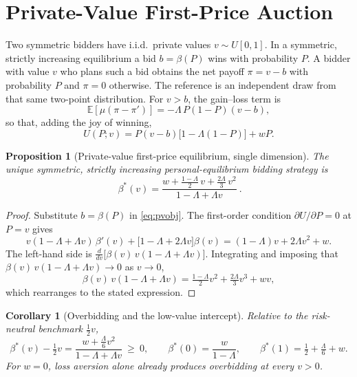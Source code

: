 \documentclass[11pt,a4paper]{article}
\newtheorem{proposition}{Proposition}
\newtheorem{corollary}{Corollary}
\theoremstyle{remark}
\begin{document}
\section{Private-Value First-Price Auction}
\label{sec:pv}
Two symmetric bidders have i.i.d.\ private values $v\sim U[0,1]$. In a symmetric,
strictly increasing equilibrium a bid $b=\beta(P)$ wins with probability $P$. A
bidder with value $v$ who plans such a bid obtains the net payoff $\pi=v-b$ with
probability $P$ and $\pi=0$ otherwise. The reference is an independent draw from
that same two-point distribution. For $v>b$, the gain--loss term is
\begin{equation}
\mathbb{E}[\mu(\pi-\pi')]=-\Lambda\,P(1-P)(v-b),
\end{equation}
so that, adding the joy of winning,
\begin{equation}
U(P;v)=P(v-b)\big[1-\Lambda(1-P)\big]+wP .
\label{eq:pvobj}
\end{equation}
\begin{proposition}[Private-value first-price equilibrium, single dimension]
\label{prop:pv}
The unique symmetric, strictly increasing personal-equilibrium bidding strategy is
\begin{equation}
\boxed{\ \beta^{*}(v)=\frac{w+\tfrac{1-\Lambda}{2}\,v+\tfrac{2\Lambda}{3}\,v^{2}}
{1-\Lambda+\Lambda v}\ }.
\end{equation}
\end{proposition}
\begin{proof}
Substitute $b=\beta(P)$ in \eqref{eq:pvobj}. The first-order condition
$\partial U/\partial P=0$ at $P=v$ gives
\begin{equation}
v(1-\Lambda+\Lambda v)\,\beta'(v)+\big[1-\Lambda+2\Lambda v\big]\beta(v)
=(1-\Lambda)v+2\Lambda v^{2}+w .
\end{equation}
The left-hand side is $\frac{d}{dv}\big[\beta(v)\,v(1-\Lambda+\Lambda v)\big]$.
Integrating and imposing that $\beta(v)\,v(1-\Lambda+\Lambda v)\to0$ as $v\to0$,
\begin{equation}
\beta(v)\,v(1-\Lambda+\Lambda v)=\tfrac{1-\Lambda}{2}v^{2}+\tfrac{2\Lambda}{3}v^{3}+wv,
\end{equation}
which rearranges to the stated expression.
\end{proof}
\begin{corollary}[Overbidding and the low-value intercept]
\label{cor:pvover}
Relative to the risk-neutral benchmark $\tfrac12 v$,
\begin{equation}
\beta^{*}(v)-\tfrac12 v=\frac{w+\tfrac{\Lambda}{6}v^{2}}{1-\Lambda+\Lambda v}\ \ge\ 0 ,
\qquad
\beta^{*}(0)=\frac{w}{1-\Lambda},\qquad \beta^{*}(1)=\tfrac12+\tfrac{\Lambda}{6}+w .
\end{equation}
For $w=0$, loss aversion alone already produces overbidding at every $v>0$.
\end{corollary}
\end{document}
